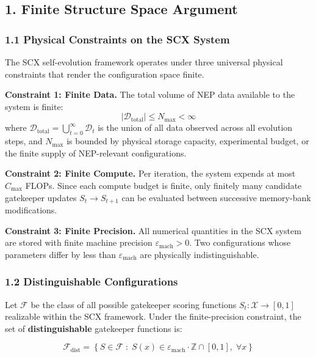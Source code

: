 \documentclass[
  12pt,
]{ctexart}
\begin{document}
\subsection{1. Finite Structure Space
Argument}\label{finite-structure-space-argument}

\subsubsection{1.1 Physical Constraints on the SCX
System}\label{physical-constraints-on-the-scx-system}

The SCX self-evolution framework operates under three universal physical
constraints that render the configuration space finite.

\textbf{Constraint 1: Finite Data.} The total volume of NEP data
available to the system is finite:
\[|\mathcal{D}_{\text{total}}| \leq N_{\text{max}} < \infty\] where
\(\mathcal{D}_{\text{total}} = \bigcup_{t=0}^{\infty} \mathcal{D}_t\) is
the union of all data observed across all evolution steps, and
\(N_{\text{max}}\) is bounded by physical storage capacity, experimental
budget, or the finite supply of NEP-relevant configurations.

\textbf{Constraint 2: Finite Compute.} Per iteration, the system expends
at most \(C_{\text{max}}\) FLOPs. Since each compute budget is finite,
only finitely many candidate gatekeeper updates \(S_t \to S_{t+1}\) can
be evaluated between successive memory-bank modifications.

\textbf{Constraint 3: Finite Precision.} All numerical quantities in the
SCX system are stored with finite machine precision
\(\varepsilon_{\text{mach}} > 0\). Two configurations whose parameters
differ by less than \(\varepsilon_{\text{mach}}\) are physically
indistinguishable.

\subsubsection{1.2 Distinguishable
Configurations}\label{distinguishable-configurations}

Let \(\mathcal{F}\) be the class of all possible gatekeeper scoring
functions \(S_t: \mathcal{X} \to [0,1]\) realizable within the SCX
framework. Under the finite-precision constraint, the set of
\textbf{distinguishable} gatekeeper functions is:

\[\mathcal{F}_{\text{dist}} = \left\{ S \in \mathcal{F} \;:\; S(x) \in \varepsilon_{\text{mach}} \cdot \mathbb{Z} \cap [0,1],\; \forall x \right\}\]
\end{document}
